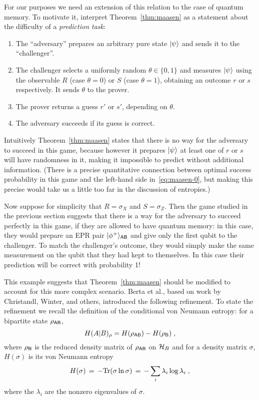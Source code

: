 For our purposes we need an extension of this relation to the case of quantum memory. To motivate it, interpret Theorem~\ref{thm:maasen} as a statement about the difficulty of a \emph{prediction task}:
\begin{enumerate}
\item The ``adversary'' prepares an arbitrary pure state $|\psi\rangle$ and sends it to the ``challenger''.
\item The challenger selects a uniformly random $\theta\in\{0,1\}$ and measures $|\psi\rangle$ using the observable $R$ (case $\theta=0$) or $S$ (case $\theta=1$), obtaining an outcome $r$ or $s$ respectively. It sends $\theta$ to the prover.
\item The prover returns a guess $r'$ or $s'$, depending on $\theta$. 
\item The adversary succeeds if its guess is correct. 
\end{enumerate}
Intuitively Theorem~\ref{thm:maasen} states that there is no way for the adversary to succeed in this game, because however it prepares $|\psi\rangle$ at least one of $r$ or $s$ will have randomness in it, making it impossible to predict without additional information. (There is a precise quantitative connection between optimal success probability in this game and the left-hand side in~\eqref{eq:maasen-0}, but making this precise would take us a little too far in the discussion of entropies.)

Now suppose for simplicity that $R=\sigma_X$ and $S=\sigma_Z$. Then the game studied in the previous section suggests that there is a way for the adversary to succeed perfectly in this game, if they are allowed to have quantum memory: in this case, they would prepare an EPR pair $|\phi^+\rangle_{{\textsf{AB}}}$ and give only the first qubit to the challenger. To match the challenger's outcome, they would simply make the same measurement on the qubit that they had kept to themselves. In this case their prediction will be correct with probability 1! 

This example suggests that Theorem~\ref{thm:maasen} should be modified to account for this more complex scenario. Berta et al., based on work by Christandl, Winter, and others, introduced the following refinement. To state the refinement we recall the definition of the conditional von Neumann entropy: for a bipartite state $\rho_{{\textsf{A}}{\textsf{B}}}$, 
\begin{equation}\label{eq:def-cond-vn}
H(A|B)_\rho = H(\rho_{{\textsf{AB}}}) - H(\rho_{\textsf{B}})\;,
\end{equation}
where $\rho_{{\textsf{B}}}$ is the reduced density matrix of $\rho_{{\textsf{AB}}}$ on $\mathcal{H}_B$ and for a density matrix $\sigma$, $H(\sigma)$ is its von Neumann entropy
\[H(\sigma) \,=\,  -\mbox{\rm Tr}(\sigma\ln\sigma) \,=\,  -\sum_i \lambda_i\log \lambda_i\;,\]
 where the $\lambda_i$ are the nonzero eigenvalues of $\sigma$. 

